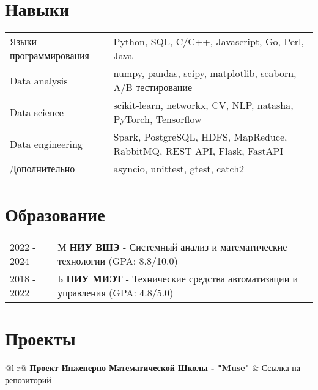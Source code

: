 \documentclass[a4paper,12pt]{article}
\begin{document}

\section{Навыки}
\begin{tabularx}{\linewidth}{@{}l X@{}}
Языки программирования &  \normalsize{Python, SQL, C/C++, Javascript, Go, Perl, Java}\\
Data analysis  &  \normalsize{numpy, pandas, scipy, matplotlib, seaborn, A/B тестирование}\\ 
Data science  &  \normalsize{scikit-learn, networkx, CV, NLP, natasha, PyTorch, Tensorflow}\\ 
Data engineering  &  \normalsize{Spark, PostgreSQL, HDFS, MapReduce, RabbitMQ, REST API, Flask, FastAPI}\\ 
Дополнительно  &  \normalsize{asyncio, unittest, gtest, catch2}\\ 

\end{tabularx}



\section{Образование}
\begin{tabularx}{\linewidth}{@{}l X@{}}	
2022 - 2024 & М \textbf{НИУ ВШЭ} - Системный анализ и математические технологии \hfill \normalsize (GPA: 8.8/10.0) \\

2018 - 2022 & Б  \textbf{ НИУ МИЭТ} - Технические средства автоматизации и управления \hfill \normalsize (GPA: 4.8/5.0) \\ 

\end{tabularx}


\section{Проекты}

\begin{tabularx}{\linewidth}{ @{}l r@{} }
\textbf{Проект Инженерно Математической Школы - "Muse"} & \hfill \href{https://github.com/deepvk/muse}{Ссылка на репозиторий} \\[3.75pt]
  \\
\end{tabularx}
\end{document}
